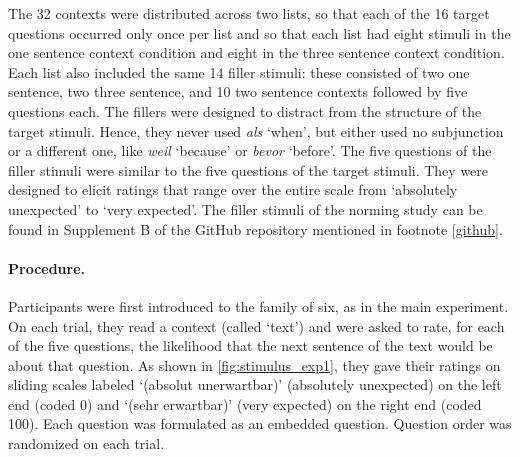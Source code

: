 \documentclass{salt}
\begin{document}
The 32 contexts were distributed across two lists, so that each of the 16 target questions occurred only once per list and so that each list had eight stimuli in the one sentence context condition and eight in the three sentence context condition.  Each list also included the same 14 filler stimuli: these consisted of two one sentence, two three sentence, and 10 two sentence contexts followed by five questions each. The fillers were designed to distract from the structure of the target stimuli. Hence, they never used \textit{als} ‘when’, but either used no subjunction or a different one, like \textit{weil} `because' or \textit{bevor} `before'. The five questions of the filler stimuli were similar to the five questions of the target stimuli. They were designed to elicit ratings that range over the entire scale from `absolutely unexpected' to `very expected'. The filler stimuli of the norming study can be found in Supplement B of the GitHub repository mentioned in footnote \ref{github}.

\paragraph{Procedure.}

Participants were first introduced to the family of six, as in the main experiment. On each trial, they read a context (called `text') and were asked to rate, for each of the five questions, the likelihood that the next sentence of the text would be about that question. As shown in \autoref{fig:stimulus_exp1}, they gave their ratings on sliding scales labeled `(absolut unerwartbar)' (absolutely unexpected) on the left end (coded 0) and `(sehr erwartbar)' (very expected) on the right end (coded 100). Each question was formulated as an embedded question. Question order was randomized on each trial.
\end{document}
